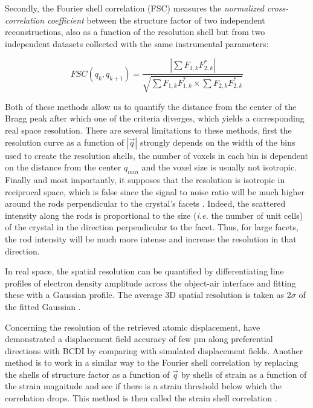 Secondly, the Fourier shell correlation (FSC) \parencite{van_heel_fourier_2005} measures the \textit{normalized cross-correlation coefficient} between the structure factor of two independent reconstructions, also as a function of the resolution shell but from two independent datasets collected with the same instrumental parameters:

\begin{equation}
    FSC(q_k, q_{k+1}) = \frac{ |\sum F_{1,k} F_{2,k}^*| }{\sqrt{ \sum F_{1,k} F_{1,k}^* \times \sum F_{2,k} F_{2,k}^*}}
\end{equation}

Both of these methods allow us to quantify the distance from the center of the Bragg peak after which one of the criteria diverges, which yields a corresponding real space resolution.
There are several limitations to these methods, first the resolution curve as a function of $|\vec{q}|$ strongly depends on the width of the bins used to create the resolution shells, the number of voxels in each bin is dependent on the distance from the center $q_{min}$ and the voxel size is usually not isotropic.
Finally and most importantly, it supposes that the resolution is isotropic in reciprocal space, which is false since the signal to noise ratio will be much higher around the rods perpendicular to the crystal's facets \parencite{cherukara_anisotropic_2018}.
Indeed, the scattered intensity along the rods is proportional to the size (\textit{i.e.} the number of unit cells) of the crystal in the direction perpendicular to the facet.
Thus, for large facets, the rod intensity will be much more intense and increase the resolution in that direction.

In real space, the spatial resolution can be quantified by differentiating line profiles of electron density amplitude across the object-air interface and fitting these with a Gaussian profile.
The average 3D spatial resolution is taken as 2$\sigma$ of the fitted Gaussian \parencite{hofmann_nanoscale_2020}.

Concerning the resolution of the retrieved atomic displacement, \cite{labat_inversion_2015} have demonstrated a displacement field accuracy of few pm along preferential directions with BCDI by comparing with simulated displacement fields.
Another method is to work in a similar way to the Fourier shell correlation by replacing the shells of structure factor as a function of $\vec{q}$ by shells of strain as a function of the strain magnitude and see if there is a strain threshold below which the correlation drops.
This method is then called the strain shell correlation \parencite{Girard2020}.

